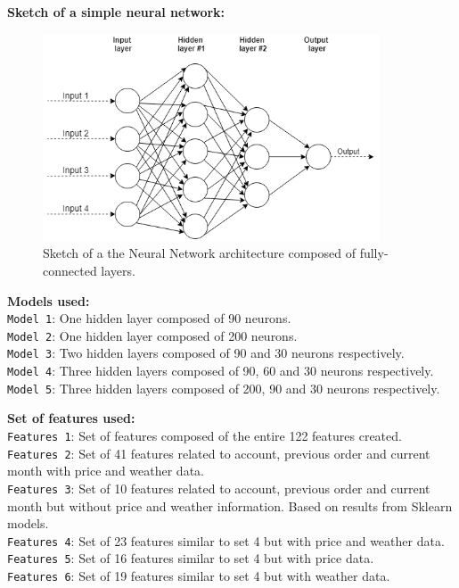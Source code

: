 \textbf{Sketch of a simple neural network:}
\begin{figure}[h]
    \centering
    \includegraphics[width=10cm]{images/nn-sketch.png}
    \caption{Sketch of a the Neural Network architecture composed of fully-connected layers.}
    \label{fig-annex:nn-sketch}
\end{figure}

\noindent\textbf{Models used:}\\
\texttt{Model 1}: One hidden layer composed of 90 neurons. \\
\texttt{Model 2}: One hidden layer composed of 200 neurons. \\
\texttt{Model 3}: Two hidden layers composed of 90 and 30 neurons respectively. \\
\texttt{Model 4}: Three hidden layers composed of 90, 60 and 30 neurons respectively. \\
\texttt{Model 5}: Three hidden layers composed of 200, 90 and 30 neurons respectively. \\

\pagebreak

\noindent\textbf{Set of features used:}\\
\texttt{Features 1}: Set of features composed of the entire 122 features created. \\
\texttt{Features 2}: Set of 41 features related to account, previous order and current month with price and weather data. \\
\texttt{Features 3}: Set of 10 features related to account, previous order and current month but without price and weather information. Based on results from Sklearn models.\\
\texttt{Features 4}: Set of 23 features similar to set 4 but with price and weather data. \\
\texttt{Features 5}: Set of 16 features similar to set 4 but with price data. \\
\texttt{Features 6}: Set of 19 features similar to set 4 but with weather data. \\


